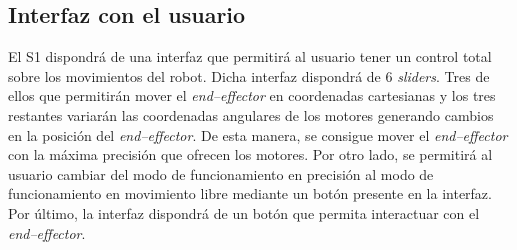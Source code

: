 \subsection{Interfaz con el usuario}
El \ac{S1} dispondrá de una interfaz que permitirá al usuario tener un control total sobre los movimientos del robot. Dicha interfaz dispondrá de 6 \textit{sliders}. Tres de ellos que permitirán mover el \textit{end--effector} en coordenadas cartesianas y los tres restantes variarán las coordenadas angulares de los motores generando cambios en la posición del \textit{end--effector}. De esta manera, se consigue mover el \textit{end--effector} con la máxima precisión que ofrecen los motores. Por otro lado, se permitirá al usuario cambiar del modo de funcionamiento en precisión al modo de funcionamiento en movimiento libre mediante un botón presente en la interfaz. Por último, la interfaz dispondrá de un botón que permita interactuar con el \textit{end--effector}.